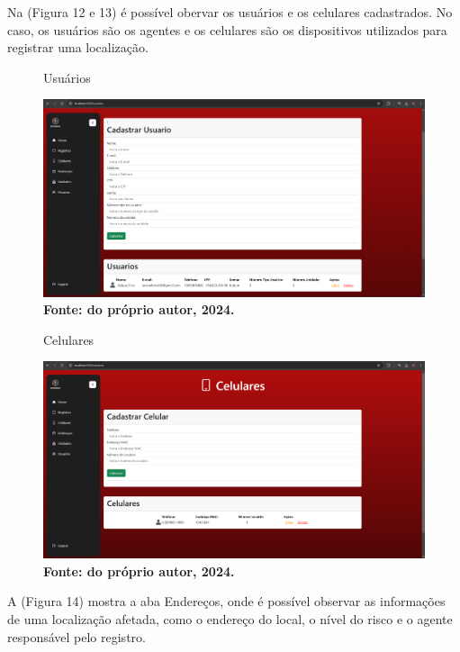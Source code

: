 \vspace{12pt}


Na (Figura 12 e 13) é possível obervar os usuários e os celulares cadastrados. No caso, os usuários são os agentes e os celulares são os dispositivos utilizados para registrar uma localização.

\begin{figure}[H]
    \centering
    \caption{Usuários}
    \includegraphics[width=1.0\linewidth]{Illustrations/Usuario.png}
    \caption*{\textbf{Fonte: do próprio autor, 2024.}}
\end{figure}

\vspace{12pt}

\begin{figure}[H]
    \centering
    \caption{Celulares}
    \includegraphics[width=1.0\linewidth]{Illustrations/celulares.png}
    \caption*{\textbf{Fonte: do próprio autor, 2024.}}
\end{figure}

\vspace{12pt}

A (Figura 14) mostra a aba Endereços, onde é possível observar as informações de uma localização afetada, como o endereço do local, o nível do risco e o agente responsável pelo registro. 

